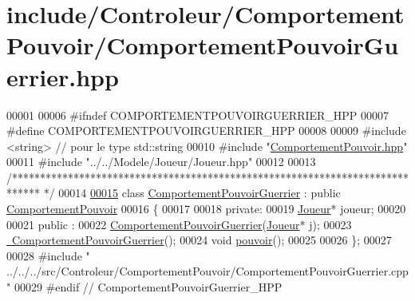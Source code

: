 \hypertarget{_comportement_pouvoir_guerrier_8hpp_source}{\section{include/\-Controleur/\-Comportement\-Pouvoir/\-Comportement\-Pouvoir\-Guerrier.hpp}
}

\begin{DoxyCode}
00001 
00006 \textcolor{preprocessor}{#ifndef COMPORTEMENTPOUVOIRGUERRIER\_HPP}
00007 \textcolor{preprocessor}{}\textcolor{preprocessor}{#define COMPORTEMENTPOUVOIRGUERRIER\_HPP}
00008 \textcolor{preprocessor}{}
00009 \textcolor{preprocessor}{#include <string>} \textcolor{comment}{// pour le type std::string}
00010 \textcolor{preprocessor}{#include "\hyperlink{_comportement_pouvoir_8hpp}{ComportementPouvoir.hpp}"}
00011 \textcolor{preprocessor}{#include "../../Modele/Joueur/Joueur.hpp"}
00012 
00013 \textcolor{comment}{/*****************************************************************************
      */}
00014 
\hypertarget{_comportement_pouvoir_guerrier_8hpp_source_l00015}{}\hyperlink{class_comportement_pouvoir_guerrier}{00015} \textcolor{keyword}{class }\hyperlink{class_comportement_pouvoir_guerrier}{ComportementPouvoirGuerrier} : \textcolor{keyword}{public} \hyperlink{class_comportement_pouvoir}{ComportementPouvoir}
00016 \{
00017 
00018    \textcolor{keyword}{private}:
00019     \hyperlink{class_joueur}{Joueur}* joueur;
00020 
00021    \textcolor{keyword}{public} :
00022       \hyperlink{class_comportement_pouvoir_guerrier_a5b4e19698e98c3d7a58a3859c6ca5118}{ComportementPouvoirGuerrier}(\hyperlink{class_joueur}{Joueur}* j);
00023       \hyperlink{class_comportement_pouvoir_guerrier_ae5113657a16d91283b311f18aa32b1e9}{~ComportementPouvoirGuerrier}();
00024       \textcolor{keywordtype}{void} \hyperlink{class_comportement_pouvoir_guerrier_a2747bbff54360379e100aa62254a2a79}{pouvoir}();
00025     
00026 \};
00027 
00028 \textcolor{preprocessor}{#include "
      ../../../src/Controleur/ComportementPouvoir/ComportementPouvoirGuerrier.cpp"}
00029 \textcolor{preprocessor}{#endif // ComportementPouvoirGuerrier\_HPP}
\end{DoxyCode}
